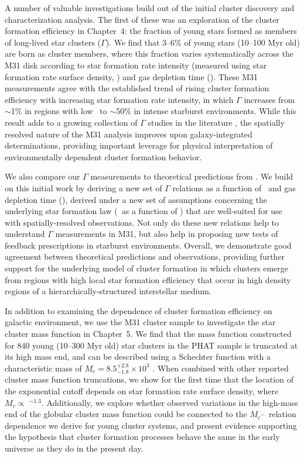 A number of valuable investigations build out of the initial cluster discovery and characterization analysis.  The first of these was an exploration of the cluster formation efficiency in Chapter~4: the fraction of young stars formed as members of long-lived star clusters ($\Gamma$).  We find that 3--6\% of young stars (10--100 Myr old) are born as cluster members, where this fraction varies systematically across the M31 disk according to star formation rate intensity (measured using star formation rate surface density, \SigSFR) and gas depletion time (\tdep).  These M31 measurements agree with the established trend of rising cluster formation efficiency with increasing star formation rate intensity, in which $\Gamma$ increases from $\sim$1\% in regions with low \SigSFR\ to $\sim$50\% in intense starburst environments.  While this result adds to a growing collection of $\Gamma$ studies in the literature \citep[e.g.,][]{Goddard10, Adamo11, Cook12, Adamo15}, the spatially resolved nature of the M31 analysis improves upon galaxy-integrated determinations, providing important leverage for physical interpretation of environmentally dependent cluster formation behavior.

We also compare our $\Gamma$ measurements to theoretical predictions from \citet{Kruijssen12}.  We build on this initial work by deriving a new set of $\Gamma$ relations as a function of \SigSFR\ and gas depletion time (\tdep), derived under a new set of assumptions concerning the underlying star formation law (\SigSFR\ as a function of \SigGas) that are well-suited for use with spatially-resolved observations.  Not only do these new relations help to understand $\Gamma$ measurements in M31, but also help in proposing new tests of feedback prescriptions in starburst environments.  Overall, we demonstrate good agreement between theoretical predictions and observations, providing further support for the underlying model of cluster formation in which clusters emerge from regions with high local star formation efficiency that occur in high density regions of a hierarchically-structured interstellar medium.

In addition to examining the dependence of cluster formation efficiency on galactic environment, we use the M31 cluster sample to investigate the star cluster mass function in Chapter~5.  We find that the mass function constructed for 840 young (10--300 Myr old) star clusters in the PHAT sample is truncated at its high mass end, and can be described using a Schechter function with a characteristic mass of $M_c = 8.5^{+2.8}_{-1.8} \times 10^3$ \solmass.  When combined with other reported cluster mass function truncations, we show for the first time that the location of the exponential cutoff depends on star formation rate surface density, where $M_c \propto$ \SigSFR$^{\sim1.3}$.  Additionally, we explore whether observed variations in the high-mass end of the globular cluster mass function could be connected to the $M_c$--\SigSFR\ relation dependence we derive for young cluster systems, and present evidence supporting the hypothesis that cluster formation processes behave the same in the early universe as they do in the present day.

